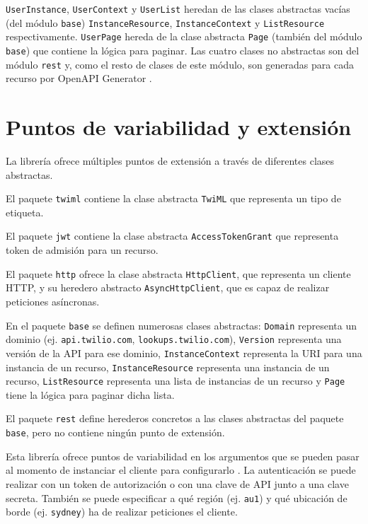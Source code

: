 \documentclass{article}
\begin{document}
\verb|UserInstance|, \verb|UserContext| y \verb|UserList|
heredan de las clases abstractas vacías
(del módulo \verb|base|)
\verb|InstanceResource|, \verb|InstanceContext| y \verb|ListResource|
respectivamente.
\verb|UserPage| hereda de la clase abstracta
\verb|Page| (también del módulo \verb|base|)
que contiene la lógica para paginar.
Las cuatro clases no abstractas son del módulo \verb|rest|
y, como el resto de clases de este módulo,
son generadas para cada recurso por OpenAPI Generator
\cite{twilio-generated-openapi}.



\section{Puntos de variabilidad y extensión}

La librería ofrece múltiples puntos de extensión
a través de diferentes clases abstractas.

El paquete \verb|twiml| contiene la clase abstracta \verb|TwiML|
que representa un tipo de etiqueta.

El paquete \verb|jwt| contiene la clase abstracta \verb|AccessTokenGrant|
que representa token de admisión para un recurso.

El paquete \verb|http| ofrece la clase abstracta
\verb|HttpClient|, que representa un cliente HTTP,
y su heredero abstracto \verb|AsyncHttpClient|,
que es capaz de realizar peticiones asíncronas.

En el paquete \verb|base| se definen numerosas clases abstractas:
\verb|Domain| representa un dominio
(ej. \verb|api.twilio.com|, \verb|lookups.twilio.com|),
\verb|Version| representa una versión de la API para ese dominio,
\verb|InstanceContext| representa la URI para una instancia de un recurso,
\verb|InstanceResource| representa una instancia de un recurso,
\verb|ListResource| representa una lista de instancias de un recurso
y \verb|Page| tiene la lógica para paginar dicha lista.

El paquete \verb|rest| define herederos concretos a las clases abstractas
del paquete \verb|base|, pero no contiene ningún punto de extensión.

\hfill

Esta librería ofrece puntos de variabilidad
en los argumentos que se pueden pasar
al momento de instanciar el cliente para configurarlo
\cite{readme}.
La autenticación se puede realizar con un token de autorización o
con una clave de API junto a una clave secreta.
También se puede especificar a qué región (ej. \verb|au1|)
y qué ubicación de borde (ej. \verb|sydney|)
ha de realizar peticiones el cliente.
\end{document}
